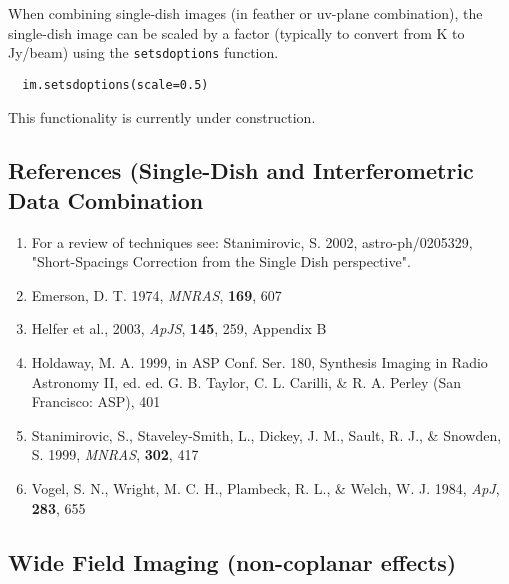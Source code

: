 When combining single-dish images (in feather or uv-plane
combination), the single-dish image can be scaled by a factor
(typically to convert from K to Jy/beam) using the {\tt setsdoptions}
function.

\small
\begin{verbatim}
  im.setsdoptions(scale=0.5)
\end{verbatim}
\normalsize

\vspace{3mm}

This functionality is currently under construction.

\subsection{References (Single-Dish and Interferometric Data Combination}
\label{subsection:synth.refs.SDcombo}

\begin{enumerate}
   \item For a review of techniques see: Stanimirovic, S. 2002,
         astro-ph/0205329, "Short-Spacings Correction from the Single
         Dish perspective".
   \item Emerson, D. T. 1974, {\it MNRAS}, {\bf 169}, 607
   \item Helfer et al., 2003, {\it ApJS}, {\bf 145}, 259, Appendix B
   \item Holdaway, M. A. 1999, in ASP Conf. Ser. 180, Synthesis
         Imaging in Radio Astronomy II, ed. ed. G. B. Taylor,
         C. L. Carilli, \& R. A. Perley (San Francisco: ASP), 401
   \item Stanimirovic, S., Staveley-Smith, L., Dickey, J. M., Sault,
         R. J., \& Snowden, S. 1999, {\it MNRAS}, {\bf 302}, 417 
   \item Vogel, S. N., Wright, M. C. H., Plambeck, R. L., \& Welch,
         W. J. 1984, {\it ApJ}, {\bf 283}, 655 
\end{enumerate}

\subsection{Wide Field Imaging (non-coplanar effects)}
\label{subsection:synth.im.wide.field}

\vspace{3mm}

